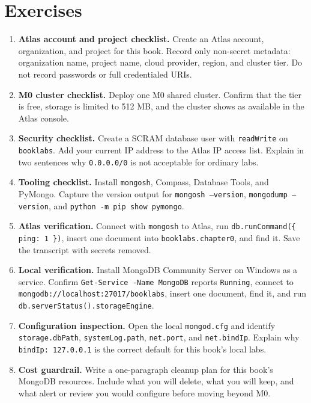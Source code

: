 \section{Exercises}
\begin{enumerate}
    \item \textbf{Atlas account and project checklist.} Create an Atlas account, organization, and project for this book. Record only non-secret metadata: organization name, project name, cloud provider, region, and cluster tier. Do not record passwords or full credentialed URIs.
    \item \textbf{M0 cluster checklist.} Deploy one M0 shared cluster. Confirm that the tier is free, storage is limited to 512 MB, and the cluster shows as available in the Atlas console.
    \item \textbf{Security checklist.} Create a SCRAM database user with \texttt{readWrite} on \texttt{booklabs}. Add your current IP address to the Atlas IP access list. Explain in two sentences why \texttt{0.0.0.0/0} is not acceptable for ordinary labs.
    \item \textbf{Tooling checklist.} Install \texttt{mongosh}, Compass, Database Tools, and PyMongo. Capture the version output for \texttt{mongosh --version}, \texttt{mongodump --version}, and \texttt{python -m pip show pymongo}.
    \item \textbf{Atlas verification.} Connect with \texttt{mongosh} to Atlas, run \texttt{db.runCommand(\{ ping: 1 \})}, insert one document into \texttt{booklabs.chapter0}, and find it. Save the transcript with secrets removed.
    \item \textbf{Local verification.} Install MongoDB Community Server on Windows as a service. Confirm \texttt{Get-Service -Name MongoDB} reports \texttt{Running}, connect to \texttt{mongodb://localhost:27017/booklabs}, insert one document, find it, and run \texttt{db.serverStatus().storageEngine}.
    \item \textbf{Configuration inspection.} Open the local \texttt{mongod.cfg} and identify \texttt{storage.dbPath}, \texttt{systemLog.path}, \texttt{net.port}, and \texttt{net.bindIp}. Explain why \texttt{bindIp: 127.0.0.1} is the correct default for this book's local labs.
    \item \textbf{Cost guardrail.} Write a one-paragraph cleanup plan for this book's MongoDB resources. Include what you will delete, what you will keep, and what alert or review you would configure before moving beyond M0.
\end{enumerate}

